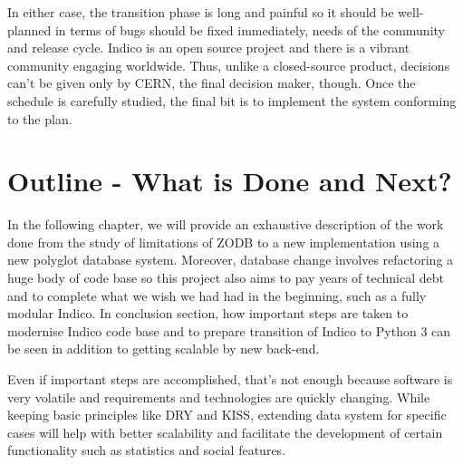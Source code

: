 \par In either case, the transition phase is long and painful so it should be well-planned in terms of bugs should be fixed immediately, needs of the community and release cycle. Indico is an open source project and there is a vibrant community engaging worldwide. Thus, unlike a closed-source product, decisions can't be given only by \textsc{CERN}, the final decision maker, though. Once the schedule is carefully studied, the final bit is to implement the system conforming to the plan.

\section{Outline - What is Done and Next?}

\par In the following chapter, we will provide an exhaustive description of the work done from the study of limitations of ZODB to a new implementation using a new polyglot database system. Moreover, database change involves refactoring a huge body of code base so this project also aims to pay years of technical debt and to complete what we wish we had had in the beginning, such as a fully modular Indico. In conclusion section, how important steps are taken to modernise Indico code base and to prepare transition of Indico to Python 3 can be seen in addition to getting scalable by new back-end.

\par Even if important steps are accomplished, that's not enough because software is very volatile and requirements and technologies are quickly changing. While keeping basic principles like DRY and KISS, extending data system for specific cases will help with better scalability and facilitate the development of certain functionality such as statistics and social features.


